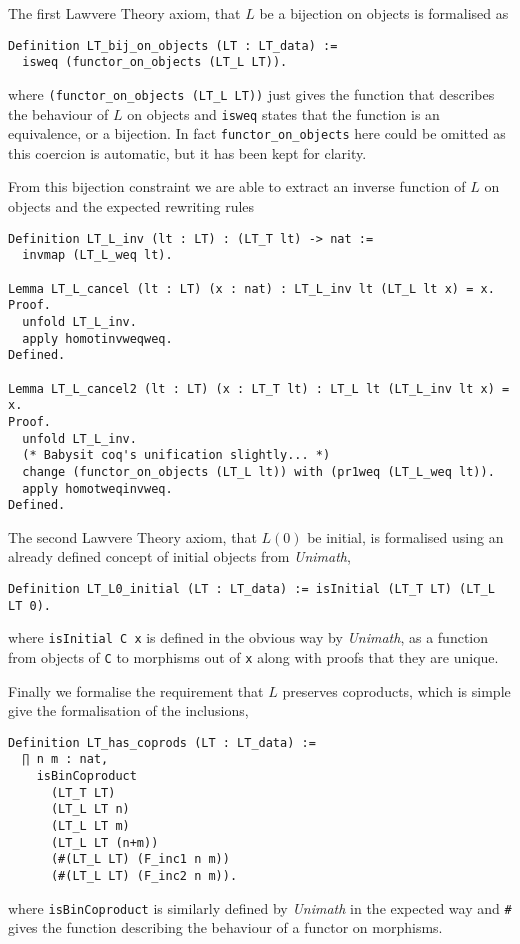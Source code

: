 The first Lawvere Theory axiom, that $L$ be a bijection on objects is formalised
as
\begin{lstlisting}
Definition LT_bij_on_objects (LT : LT_data) := 
  isweq (functor_on_objects (LT_L LT)).
\end{lstlisting}
where \verb|(functor_on_objects (LT_L LT))| just gives the function that
describes the behaviour of $L$ on objects and \verb|isweq| states that the
function is an equivalence, or a bijection. In fact \verb|functor_on_objects|
here could be omitted as this coercion is automatic, but it has been kept for
clarity.

From this bijection constraint we are able to extract an inverse function of $L$
on objects and the expected rewriting rules
\begin{lstlisting}
Definition LT_L_inv (lt : LT) : (LT_T lt) -> nat :=
  invmap (LT_L_weq lt).

Lemma LT_L_cancel (lt : LT) (x : nat) : LT_L_inv lt (LT_L lt x) = x.
Proof.
  unfold LT_L_inv.
  apply homotinvweqweq.
Defined.
  
Lemma LT_L_cancel2 (lt : LT) (x : LT_T lt) : LT_L lt (LT_L_inv lt x) = x.
Proof.
  unfold LT_L_inv.
  (* Babysit coq's unification slightly... *)
  change (functor_on_objects (LT_L lt)) with (pr1weq (LT_L_weq lt)).
  apply homotweqinvweq.
Defined.
\end{lstlisting}

The second Lawvere Theory axiom, that $L(0)$ be initial, is formalised using an
already defined concept of initial objects from \textit{Unimath},
\begin{lstlisting}
Definition LT_L0_initial (LT : LT_data) := isInitial (LT_T LT) (LT_L LT 0).
\end{lstlisting}
where \verb|isInitial C x| is defined in the obvious way by \textit{Unimath}, as
a function from objects of \verb|C| to morphisms out of \verb|x| along with
proofs that they are unique.

Finally we formalise the requirement that $L$ preserves coproducts, which is
simple give the formalisation of the inclusions,
\begin{lstlisting}
Definition LT_has_coprods (LT : LT_data) := 
  ∏ n m : nat, 
    isBinCoproduct 
      (LT_T LT)
      (LT_L LT n)
      (LT_L LT m)
      (LT_L LT (n+m))
      (#(LT_L LT) (F_inc1 n m)) 
      (#(LT_L LT) (F_inc2 n m)).
\end{lstlisting}
where \verb|isBinCoproduct| is similarly defined by \textit{Unimath} in the
expected way and \verb|#| gives the function describing the behaviour of a
functor on morphisms.

